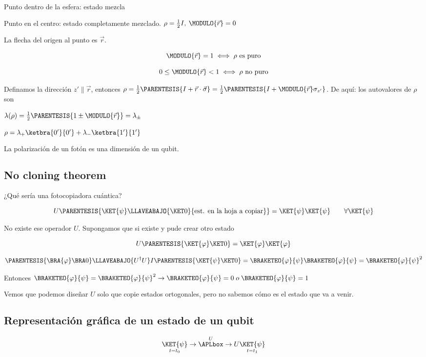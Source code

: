 Punto dentro de la esfera: estado mezcla

Punto en el centro: estado completamente mezclado. $\rho=\frac{1}{2}I,\:\MODULO{\vec{r}}=0$

La flecha del origen al punto es $\vec{r}$.

\[
\MODULO{\vec{r}}=1\iff\rho\text{ es puro}
\]

\[
0\leq\MODULO{\vec{r}}<1\iff\rho\text{ no puro}
\]

Definamos la dirección $z'\parallel\vec{r}$, entonces $\rho=\frac{1}{2}\PARENTESIS{I+\vec{r}\cdot\vec{\sigma}}=\frac{1}{2}\PARENTESIS{I+\MODULO{\vec{r}}\sigma_{z'}}$.
De aquí: los autovalores de $\rho$ son

$\lambda(\rho)=\frac{1}{2}\PARENTESIS{1\pm\MODULO{\vec{r}}}=\lambda_{\pm}$

$\rho=\lambda_{+}\ketbra{0'}{0'}+\lambda_{-}\ketbra{1'}{1'}$

La polarización de un fotón es una dimensión de un qubit.

\subsection{No cloning theorem}

¿Qué sería una fotocopiadora cuántica?

\[
U\PARENTESIS{\KET{\psi}\LLAVEABAJO{\KET 0}{\text{est. en la hoja a copiar}}}=\KET{\psi}\KET{\psi}\qquad\forall\KET{\psi}
\]

No existe ese operador $U$. Supongamos que si existe y pude crear
otro estado

\[
U\PARENTESIS{\KET{\varphi}\KET 0}=\KET{\varphi}\KET{\varphi}
\]

\[
\PARENTESIS{\BRA{\varphi}\BRA 0}\LLAVEABAJO{U^{\dagger}U}I\PARENTESIS{\KET{\psi}\KET 0}=\BRAKETEO{\varphi}{\psi}\BRAKETEO{\varphi}{\psi}=\BRAKETEO{\varphi}{\psi}^{2}
\]

Entonces $\BRAKETEO{\varphi}{\psi}=\BRAKETEO{\varphi}{\psi}^{2}\rightarrow\BRAKETEO{\varphi}{\psi}=0\;o\;\BRAKETEO{\varphi}{\psi}=1$

Vemos que podemos diseñar $U$ solo que copie estados ortogonales,
pero no sabemos cómo es el estado que va a venir.

\subsection{Representación gráfica de un estado de un qubit}

\[
\underset{t=t_{0}}{\KET{\psi}}\rightarrow\overset{U}{\APLbox}\rightarrow U\underset{t=t_{1}}{\KET{\psi}}
\]

